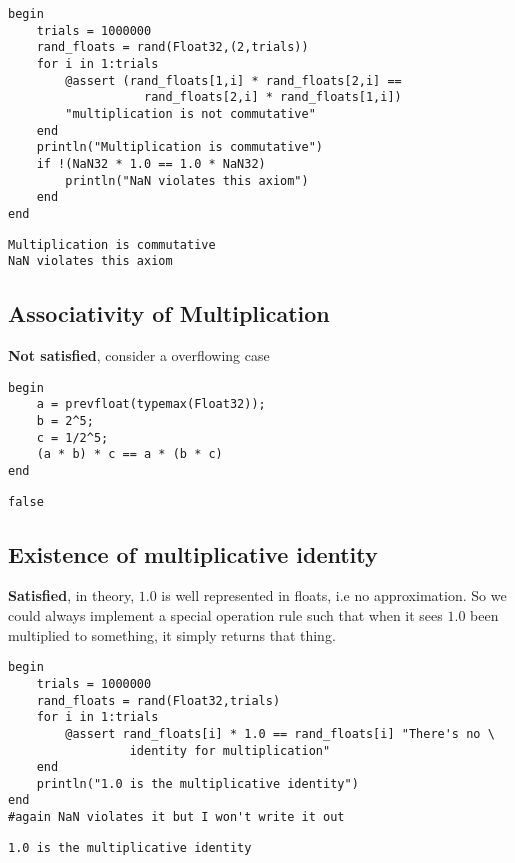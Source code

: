 \documentclass[11pt]{article}
\begin{document}
\begin{verbatim}
begin
    trials = 1000000
    rand_floats = rand(Float32,(2,trials))
    for i in 1:trials
        @assert (rand_floats[1,i] * rand_floats[2,i] ==
                   rand_floats[2,i] * rand_floats[1,i])
        "multiplication is not commutative"
    end
    println("Multiplication is commutative")
    if !(NaN32 * 1.0 == 1.0 * NaN32)
        println("NaN violates this axiom")
    end
end
\end{verbatim}

\begin{verbatim}
Multiplication is commutative
NaN violates this axiom
\end{verbatim}

\subsection{Associativity of Multiplication}
\label{sec:org5818ad5}
\textbf{Not satisfied}, consider a overflowing case

\begin{verbatim}
begin
    a = prevfloat(typemax(Float32));
    b = 2^5;
    c = 1/2^5;
    (a * b) * c == a * (b * c)
end
\end{verbatim}

\begin{verbatim}
false
\end{verbatim}

\subsection{Existence of multiplicative identity}
\label{sec:org5650838}
\textbf{Satisfied}, in theory, \(1.0\) is well represented in floats, i.e no
approximation. So we could always implement a special operation rule such that
when it sees \(1.0\) been multiplied to something, it simply returns that thing.

\begin{verbatim}
begin
    trials = 1000000
    rand_floats = rand(Float32,trials)
    for i in 1:trials
        @assert rand_floats[i] * 1.0 == rand_floats[i] "There's no \
                 identity for multiplication"
    end
    println("1.0 is the multiplicative identity")
end
#again NaN violates it but I won't write it out
\end{verbatim}

\begin{verbatim}
1.0 is the multiplicative identity
\end{verbatim}
\end{document}
